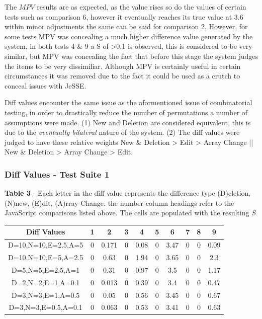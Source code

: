 \documentclass[jou,apacite]{apa6}
\begin{document}
The $MPV$ results are as expected, as the value rises so do the values of certain tests such as comparison 6, however it eventually reaches its true value at 3.6 within minor adjustments the same can be said for comparison 2. However, for some tests MPV was concealing a much higher difference value generated by the system, in both tests 4 \& 9 a S of >0.1  is observed, this is considered to be very similar, but MPV was concealing the fact that before this stage the system judges the items to be  very dissimiliar. Although MPV is certainly useful in certain circumstances it was removed due to the fact it could be used as a crutch to conceal issues with JeSSE. 

Diff values encounter the same issue as the aformentioned issue of combinatorial testing, in order to drastically reduce the number of permutations a number of assumptions were made. (1) New and Deletion are considered equivalent, this is due to the \textit{eventually bilateral} nature of the system. (2) The diff values were judged to have these relative weights New \& Deletion > Edit > Array Change || New \& Deletion > Array Change > Edit.

\subsubsection{Diff Values - Test Suite 1}

\textbf{Table 3} - Each letter in the diff value represents the difference type (D)eletion, (N)new, (E)dit, (A)rray Change. the number column headings refer to the JavaScript comparisons listed above. The cells are populated with the resulting $S$


\setlength{\tabcolsep}{2pt}
\renewcommand{\arraystretch}{1.5}

\begin{center}
 \begin{tabular}{||c c c c c c c c c c||} 
 \hline
 Diff Values & 1 & 2 & 3 & 4 & 5 & 6 & 7 & 8 & 9 \\ [-0.2ex] 
 \hline\hline
 D=10,N=10,E=2.5,A=5  & 0 & 0.171 & 0 & 0.08 & 0 & 3.47 & 0 & 0 & 0.09 \\ 
 \hline
 D=10,N=10,E=5,A=2.5  & 0 & 0.63 & 0 & 1.94 & 0 & 3.65 & 0 & 0 & 2.3  \\
 \hline
 D=5,N=5,E=2.5,A=1 & 0 & 0.31 & 0 & 0.97 & 0 & 3.5 & 0 & 0 & 1.17  \\
 \hline
  D=2,N=2,E=1,A=0.1  & 0 & 0.013 & 0 & 0.39 & 0 & 3.4 & 0 & 0 & 0.47  \\
  \hline
    D=3,N=3,E=1,A=0.5 & 0 & 0.05 & 0 & 0.56 & 0 & 3.45 & 0 & 0 & 0.67  \\
  \hline
   D=3,N=3,E=0.5,A=0.1  & 0 & 0.063 & 0 & 0.53 & 0 & 3.41 & 0 & 0 & 0.63 \\ 
  \hline
\end{tabular}
\end{center}
\end{document}
